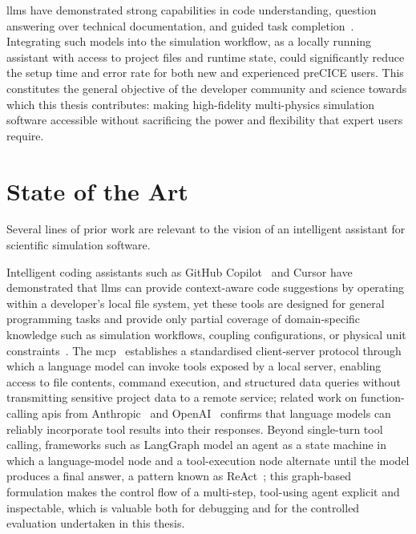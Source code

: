 \documentclass[
  numbers=noenddot,
  english,
  a4paper,
  twoside,
  bibliography=totoc,
  headsepline,
  cleardoublepage=empty,
  parskip=half,
  draft=false
]{scrbook}
\theoremstyle{break}
\renewcommand{\_}{\textunderscore\allowbreak}
\begin{document}
\Glspl{llm} have demonstrated strong capabilities in code understanding, question answering
over technical documentation, and guided task completion~\cite{chen2021copilot}.
Integrating such models into the simulation workflow, as a locally running assistant with access
to project files and runtime state, could significantly reduce the setup time and error rate
for both new and experienced preCICE users.
This constitutes the general objective of the developer community and science towards which this thesis
contributes: making high-fidelity multi-physics simulation software accessible without sacrificing
the power and flexibility that expert users require.



\section{State of the Art}\label{sec:introduction:state-of-art}

Several lines of prior work are relevant to the vision of an intelligent assistant for scientific
simulation software.

Intelligent coding assistants such as GitHub Copilot~\cite{chen2021copilot} and Cursor have
demonstrated that \glspl{llm} can provide context-aware code suggestions by operating within
a developer's local file system, yet these tools are designed for general programming tasks
and provide only partial coverage of domain-specific knowledge such as simulation workflows,
coupling configurations, or physical unit constraints~\cite{hou2024largelanguagemodels}.
The \gls{mcp}~\cite{mcp2024spec} establishes a standardised client-server protocol through
which a language model can invoke tools exposed by a local server, enabling access to file
contents, command execution, and structured data queries without transmitting sensitive project
data to a remote service; related work on function-calling \glspl{api} from
Anthropic~\cite{anthropic2024tool} and OpenAI~\cite{openai2024responses} confirms that
language models can reliably incorporate tool results into their responses.
Beyond single-turn tool calling, frameworks such as LangGraph model an agent as a state
machine in which a language-model node and a tool-execution node alternate until the model
produces a final answer, a pattern known as ReAct~\cite{yao2023react}; this graph-based
formulation makes the control flow of a multi-step, tool-using agent explicit and inspectable,
which is valuable both for debugging and for the controlled evaluation undertaken in this thesis.
\end{document}
